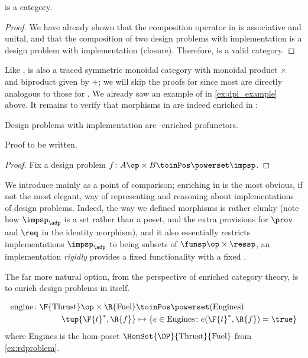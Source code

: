\begin{lemma}
    \DPI is a category.
\end{lemma}

\begin{proof}
    We have already shown that the composition operator in \DPI is associative and unital, and that the composition of two design problems with implementation is a design problem with implementation (closure).
    Therefore, \DPI is a valid category.
\end{proof}

Like \DP, \DPI is also a traced symmetric monoidal category with monoidal product $\times$ and biproduct given by $+$; we will skip the proofs for \DPI since most are directly analogous to those for \DP.
We already saw an example of \DPI in \cref{ex:dpi_example} above.
It remains to verify that morphisms in \DPI are indeed enriched in \Set:

\begin{proposition}
    Design problems with implementation are \Set-enriched profunctors.
\end{proposition}
\begin{publictodo}
    Proof to be written.
\end{publictodo}
\begin{proof}
    Fix a design problem $f \colon A\op \times B \toinPos \powerset \impsp$.
\end{proof}
We introduce \DPI mainly as a point of comparison; enriching in \Set is the most obvious, if not the most elegant, way of representing and reasoning about implementations of design problems.
Indeed, the way we defined morphisms is rather clunky (note how $\impsp_\adp$ is a set rather than a poset, and the extra provisions for $\prov$ and $\req$ in the identity morphism), and it also essentially restricts implementations $\impsp_\adp$ to being subsets of $\funsp\op \times \ressp$, \ie  an implementation \emph{rigidly} provides a fixed functionality \fun with a fixed \res.

The far more natural option, from the perspective of enriched category theory, is to enrich design problems in \DP itself.

\begin{example}
    \begin{equation}
        \begin{aligned}
            \text{engine} \colon \F{\text{Thrust}}\op \times \R{\text{Fuel}} & \toinPos \powerset(\text{Engines})                                  \\
            \tup{\F{t}^*,\R{f}}                                              & \mapsto \{ e \in \text{Engines} \colon e(\F{t}^*, \R{f}) = \true \}
        \end{aligned}
    \end{equation}
    where Engines is the hom-poset $\HomSet{\DP}{\text{Thrust}}{\text{Fuel}}$ from \cref{ex:rdproblem}.
\end{example}

